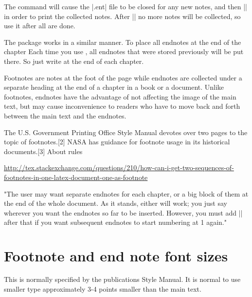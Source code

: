 The \cmd{\printnotes} command will cause the |.ent| file to be closed for any new
 notes, and then || in order to print the collected notes. After |\printnotes|
no more notes will be collected, so use it after all are done.

The  package works in a similar manner. To place all endnotes at the end of the chapter Each time you use \cmd{\theendnotes}, all endnotes that were stored previously will be put there. So just write \cmd{\theendnotes} at the end of each chapter.



Footnotes are notes at the foot of the page while endnotes are collected under a separate heading at the end of a chapter in a book or a document. Unlike footnotes, endnotes have the advantage of not affecting the image of the main text, but may cause inconvenience to readers who have to move back and forth between the main text and the endnotes.

The U.S. Government Printing Office Style Manual devotes over two pages to the topic of footnotes.[2] NASA has guidance for footnote usage in its historical documents.[3] About rules \pagenote{\notei}

\url{http://tex.stackexchange.com/questions/210/how-can-i-get-two-sequences-of-footnotes-in-one-latex-document-one-as-footnote}

 "The user may want separate endnotes for each chapter, or a big block of them at the end of the whole document. As it stands, either will work; you just say  wherever you want the endnotes so far to be inserted. However, you must add |\setcounter{endnote}{0}| after that if you want subsequent endnotes to start numbering at 1 again." 

\section*{Footnote and end note font sizes}

This is normally specified by the publications Style Manual. It is normal to use smaller type approximately 3-4 points smaller than the main text\pagenote{\noteii}\pagenote{\noteiv}.


